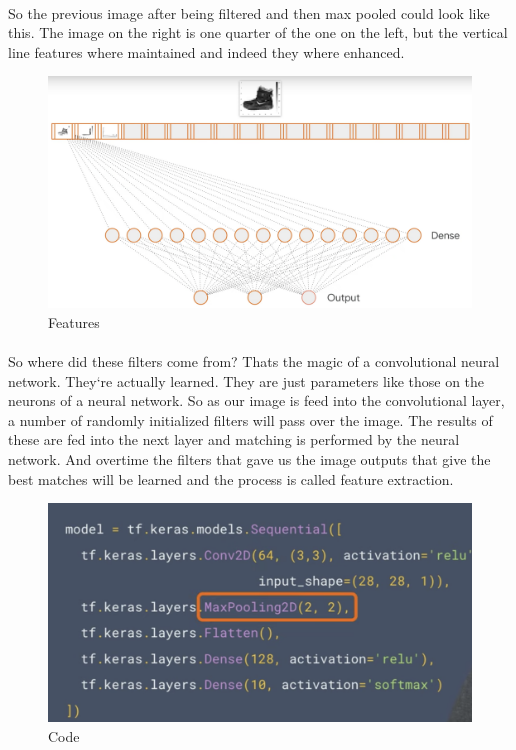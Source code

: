 \documentclass{article}
\begin{document}
    \paragraph{}
    So the previous image after being filtered and then max pooled could look like this. The image on the right is one quarter of the one on the left, but the vertical line features where maintained and indeed they where enhanced.

    \vspace{10mm}
    \begin{figure}[h!]
      \begin{center}
        \includegraphics[width=0.7\linewidth]{img/features.png}
        \caption{Features}
        \label{fig:snn}
      \end{center}
    \end{figure}
    \paragraph{}
    So where did these filters come from? Thats the magic of a convolutional neural network. They`re actually learned. They are just parameters like those on the neurons of a neural network. So as our image is feed into the convolutional layer, a number of randomly initialized filters will pass over the image. The results of these are fed into the next layer and matching is performed by the neural network. And overtime the filters that gave us the image outputs that give the best matches will be learned and the process is called feature extraction. 
    \vspace{10mm}
    \begin{figure}[h!]
      \includegraphics[width=0.4\linewidth]{img/code.png}
      \caption{Code}
      \label{fig:snn}
    \end{figure}
\end{document}
